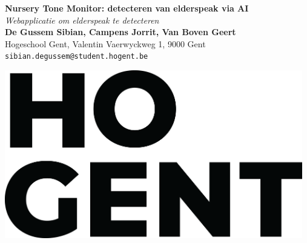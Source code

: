 \documentclass[a0,portrait]{a0poster}
\begin{document}


\begin{minipage}[t]{0.75\linewidth}
\VeryHuge \color{HoGentAccent1} \textbf{Nursery Tone Monitor: detecteren van \newline elderspeak via AI} \color{Black}\\ %
\Huge\textit{Webapplicatie om elderspeak te detecteren}\\[2.4cm] %
\huge \textbf{De Gussem Sibian, Campens Jorrit, Van Boven Geert}\\[0.5cm] %
\huge Hogeschool Gent, Valentin Vaerwyckweg 1, 9000 Gent\\[0.4cm] %
\Large \texttt{sibian.degussem@student.hogent.be} \\
\end{minipage}
%
\begin{minipage}[t]{0.30\linewidth}
\includegraphics[width=13cm,right]{figures/HOGENT_Logo_Pos_rgb.png}

\end{minipage}

\vspace{2cm} %

\end{document}
